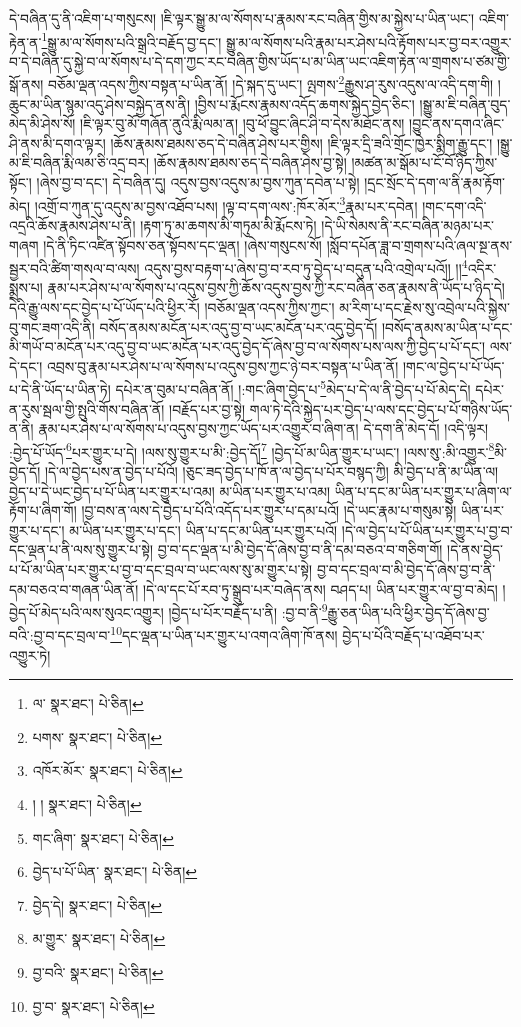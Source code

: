 དེ་བཞིན་དུ་ནི་འཇིག་པ་གསུངས། །ཇི་ལྟར་སྒྱུ་མ་ལ་སོགས་པ་རྣམས་རང་བཞིན་གྱིས་མ་སྐྱེས་པ་ཡིན་ཡང་། འཇིག་རྟེན་ན་\footnote{ལ་  སྣར་ཐང་།  པེ་ཅིན། }སྒྱུ་མ་ལ་སོགས་པའི་སྒྲའི་བརྗོད་བྱ་དང་། སྒྱུ་མ་ལ་སོགས་པའི་རྣམ་པར་ཤེས་པའི་རྟོགས་པར་བྱ་བར་འགྱུར་བ་དེ་བཞིན་དུ་སྐྱེ་བ་ལ་སོགས་པ་དེ་དག་ཀྱང་རང་བཞིན་གྱིས་ཡོད་པ་མ་ཡིན་ཡང་འཇིག་རྟེན་ལ་གྲགས་པ་ཙམ་གྱི་སྒོ་ནས། བཅོམ་ལྡན་འདས་ཀྱིས་བསྟན་པ་ཡིན་ནོ། །དེ་སྐད་དུ་ཡང་། ལྤགས་\footnote{པགས་  སྣར་ཐང་།  པེ་ཅིན། }རྒྱུས་ཤ་རུས་འདུས་ལ་འདི་དག་གི། །ཆུང་མ་ཡིན་སྙམ་འདུ་ཤེས་བསྐྱེད་ནས་ནི། །བྱིས་པ་རྨོངས་རྣམས་འདོད་ཆགས་སྐྱེད་བྱེད་ཅིང་། །སྒྱུ་མ་ཇི་བཞིན་བུད་མེད་མི་ཤེས་སོ། །ཇི་ལྟར་བུ་མོ་གཞོན་ནུའི་རྨི་ལམ་ན། །བུ་ཕོ་བྱུང་ཞིང་ཤི་བ་དེས་མཐོང་ནས། །བྱུང་ནས་དགའ་ཞིང་ཤི་ནས་མི་དགའ་ལྟར། །ཆོས་རྣམས་ཐམས་ཅད་དེ་བཞིན་ཤེས་པར་གྱིས། །ཇི་ལྟར་དྲི་ཟའི་གྲོང་ཁྱེར་སྨིག་རྒྱུ་དང་། །སྒྱུ་མ་ཇི་བཞིན་རྨི་ལམ་ཅི་འདྲ་བར། །ཆོས་རྣམས་ཐམས་ཅད་དེ་བཞིན་ཤེས་བྱ་སྟེ། །མཚན་མ་སྒོམ་པ་ངོ་བོ་ཉིད་ཀྱིས་སྟོང་། །ཞེས་བྱ་བ་དང་། དེ་བཞིན་དུ། འདུས་བྱས་འདུས་མ་བྱས་ཀུན་དབེན་པ་སྟེ། །དྲང་སྲོང་དེ་དག་ལ་ནི་རྣམ་རྟོག་མེད། །འགྲོ་བ་ཀུན་དུ་འདུས་མ་བྱས་འཐོབ་པས། །ལྟ་བ་དག་ལས་:ཁོར་མོར་\footnote{འཁོར་མོར་  སྣར་ཐང་།  པེ་ཅིན། }རྣམ་པར་དབེན། །གང་དག་འདི་འདྲའི་ཆོས་རྣམས་ཤེས་པ་ནི། །རྟག་ཏུ་མ་ཆགས་མི་གཏུམ་མི་རྨོངས་ཏེ། །དེ་ཡི་སེམས་ནི་རང་བཞིན་མཉམ་པར་གཞག །དེ་ནི་ཏིང་འཛིན་སྟོབས་ཅན་སྟོབས་དང་ལྡན། །ཞེས་གསུངས་སོ། །སློབ་དཔོན་ཟླ་བ་གྲགས་པའི་ཞལ་སྔ་ནས་སྦྱར་བའི་ཚིག་གསལ་བ་ལས། འདུས་བྱས་བརྟག་པ་ཞེས་བྱ་བ་རབ་ཏུ་བྱེད་པ་བདུན་པའི་འགྲེལ་པའོ།། །།\footnote{། །  སྣར་ཐང་།  པེ་ཅིན། }འདིར་སྨྲས་པ། རྣམ་པར་ཤེས་པ་ལ་སོགས་པ་འདུས་བྱས་ཀྱི་ཆོས་འདུས་བྱས་ཀྱི་རང་བཞིན་ཅན་རྣམས་ནི་ཡོད་པ་ཉིད་དེ། དེའི་རྒྱུ་ལས་དང་བྱེད་པ་པོ་ཡོད་པའི་ཕྱིར་རོ། །བཅོམ་ལྡན་འདས་ཀྱིས་ཀྱང་། མ་རིག་པ་དང་རྗེས་སུ་འབྲེལ་པའི་སྐྱེས་བུ་གང་ཟག་འདི་ནི། བསོད་ནམས་མངོན་པར་འདུ་བྱ་བ་ཡང་མངོན་པར་འདུ་བྱེད་དོ། །བསོད་ནམས་མ་ཡིན་པ་དང་མི་གཡོ་བ་མངོན་པར་འདུ་བྱ་བ་ཡང་མངོན་པར་འདུ་བྱེད་དོ་ཞེས་བྱ་བ་ལ་སོགས་པས་ལས་ཀྱི་བྱེད་པ་པོ་དང་། ལས་དེ་དང་། འབྲས་བུ་རྣམ་པར་ཤེས་པ་ལ་སོགས་པ་འདུས་བྱས་ཀྱང་ཉེ་བར་བསྟན་པ་ཡིན་ནོ། །གང་ལ་བྱེད་པ་པོ་ཡོད་པ་དེ་ནི་ཡོད་པ་ཡིན་ཏེ། དཔེར་ན་བུམ་པ་བཞིན་ནོ། །:གང་ཞིག་བྱེད་པ་\footnote{གང་ཞིག་  སྣར་ཐང་།  པེ་ཅིན། }མེད་པ་དེ་ལ་ནི་བྱེད་པ་པོ་མེད་དེ། དཔེར་ན་རུས་སྦལ་གྱི་སྤུའི་གོས་བཞིན་ནོ། །བརྗོད་པར་བྱ་སྟེ། གལ་ཏེ་དེའི་སྐྱེད་པར་བྱེད་པ་ལས་དང་བྱེད་པ་པོ་གཉིས་ཡོད་ན་ནི། རྣམ་པར་ཤེས་པ་ལ་སོགས་པ་འདུས་བྱས་ཀྱང་ཡོད་པར་འགྱུར་བ་ཞིག་ན། དེ་དག་ནི་མེད་དོ། །འདི་ལྟར། :བྱེད་པོ་ཡོད་\footnote{བྱེད་པ་པོ་ཡིན་  སྣར་ཐང་།  པེ་ཅིན། }པར་གྱུར་པ་དེ། །ལས་སུ་གྱུར་པ་མི་:བྱེད་དོ།\footnote{བྱེད་དེ།  སྣར་ཐང་།  པེ་ཅིན། } །བྱེད་པོ་མ་ཡིན་གྱུར་པ་ཡང་། །ལས་སུ་:མི་འགྱུར་\footnote{མ་གྱུར་  སྣར་ཐང་།  པེ་ཅིན། }མི་བྱེད་དོ། །དེ་ལ་བྱེད་པས་ན་བྱེད་པ་པོའོ། །ཅུང་ཟད་བྱེད་པ་ཁོ་ན་ལ་བྱེད་པ་པོར་བསྙད་ཀྱི། མི་བྱེད་པ་ནི་མ་ཡིན་ལ། བྱེད་པ་དེ་ཡང་བྱེད་པ་པོ་ཡིན་པར་གྱུར་པ་འམ། མ་ཡིན་པར་གྱུར་པ་འམ། ཡིན་པ་དང་མ་ཡིན་པར་གྱུར་པ་ཞིག་ལ་རྟོག་པ་ཞིག་གོ། །བྱ་བས་ན་ལས་དེ་བྱེད་པ་པོའི་འདོད་པར་གྱུར་པ་དམ་པའོ། །དེ་ཡང་རྣམ་པ་གསུམ་སྟེ། ཡིན་པར་གྱུར་པ་དང་། མ་ཡིན་པར་གྱུར་པ་དང་། ཡིན་པ་དང་མ་ཡིན་པར་གྱུར་པའོ། །དེ་ལ་བྱེད་པ་པོ་ཡིན་པར་གྱུར་པ་བྱ་བ་དང་ལྡན་པ་ནི་ལས་སུ་གྱུར་པ་སྟེ། བྱ་བ་དང་ལྡན་པ་མི་བྱེད་དོ་ཞེས་བྱ་བ་ནི་དམ་བཅའ་བ་གཅིག་གོ། །དེ་ནས་བྱེད་པ་པོ་མ་ཡིན་པར་གྱུར་པ་བྱ་བ་དང་བྲལ་བ་ཡང་ལས་སུ་མ་གྱུར་པ་སྟེ། བྱ་བ་དང་བྲལ་བ་མི་བྱེད་དོ་ཞེས་བྱ་བ་ནི་དམ་བཅའ་བ་གཞན་ཡིན་ནོ། །དེ་ལ་དང་པོ་རབ་ཏུ་སྒྲུབ་པར་བཞེད་ནས། བཤད་པ། ཡིན་པར་གྱུར་ལ་བྱ་བ་མེད། །བྱེད་པོ་མེད་པའི་ལས་སུའང་འགྱུར། །བྱེད་པ་པོར་བརྗོད་པ་ནི། :བྱ་བ་ནི་\footnote{བྱ་བའི་  སྣར་ཐང་།  པེ་ཅིན། }རྒྱུ་ཅན་ཡིན་པའི་ཕྱིར་བྱེད་དོ་ཞེས་བྱ་བའི་:བྱ་བ་དང་བྲལ་བ་\footnote{བྱ་བ་  སྣར་ཐང་།  པེ་ཅིན། }དང་ལྡན་པ་ཡིན་པར་གྱུར་པ་འགའ་ཞིག་ཁོ་ནས། བྱེད་པ་པོའི་བརྗོད་པ་འཐོབ་པར་འགྱུར་ཏེ། 